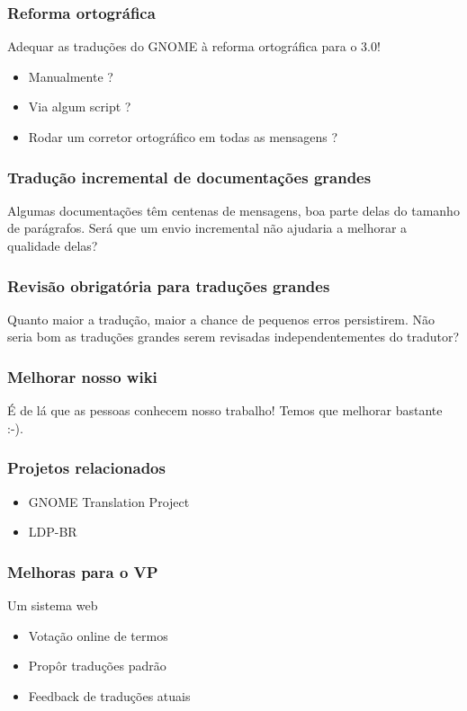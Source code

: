 \documentclass{beamer}
\begin{document}
\begin{frame}
    \frametitle{Reforma ortográfica}

    Adequar as traduções do GNOME à reforma ortográfica para o 3.0! 

    \begin{itemize}[<+->]
        \item Manualmente ? 
        \item Via algum script ?
        \item Rodar um corretor ortográfico em todas as mensagens ?  
    \end{itemize}
\end{frame}

\begin{frame}
    \frametitle{Tradução incremental de documentações grandes}
    Algumas documentações têm centenas de mensagens, boa parte delas do tamanho de parágrafos. 
    Será que um envio incremental não ajudaria a melhorar a qualidade delas?
\end{frame}

\begin{frame}
    \frametitle{Revisão obrigatória para traduções grandes}
    Quanto maior a tradução, maior a chance de pequenos erros persistirem. 
    Não seria bom as traduções grandes serem revisadas independentementes do tradutor?
\end{frame}

\begin{frame}
    \frametitle{Melhorar nosso wiki}
    É de lá que as pessoas conhecem nosso trabalho! Temos que melhorar bastante :-).
\end{frame}

\begin{frame}
  \frametitle{Projetos relacionados}
  \begin{itemize}
    \item GNOME Translation Project
    \item LDP-BR
  \end{itemize}
\end{frame}

\begin{frame}
  \frametitle{Melhoras para o VP}
  Um sistema web
  \begin{itemize}[<+->]
    \item Votação online de termos
    \item Propôr traduções padrão
    \item Feedback de traduções atuais 
  \end{itemize}
\end{frame}
\end{document}
